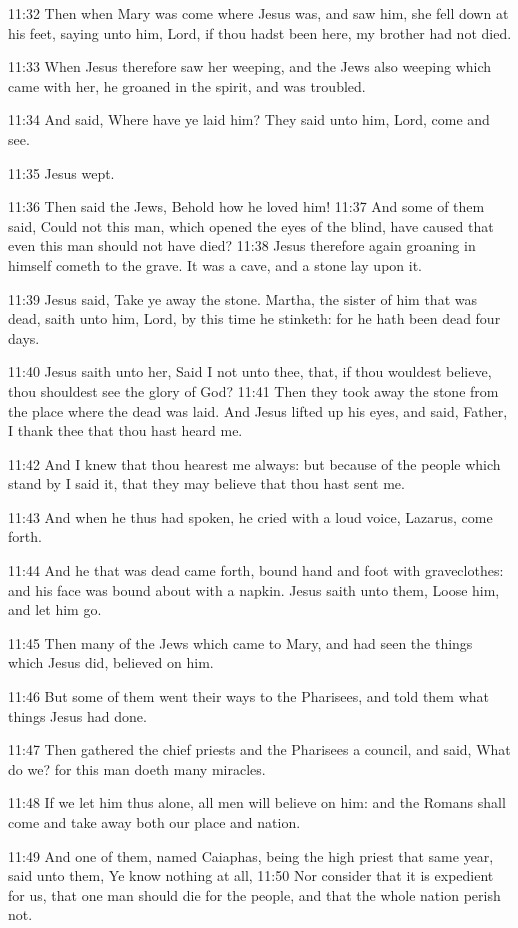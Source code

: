 11:32 Then when Mary was come where Jesus was, and saw him, she fell
down at his feet, saying unto him, Lord, if thou hadst been here, my
brother had not died.

11:33 When Jesus therefore saw her weeping, and the Jews also weeping
which came with her, he groaned in the spirit, and was troubled.

11:34 And said, Where have ye laid him? They said unto him, Lord, come
and see.

11:35 Jesus wept.

11:36 Then said the Jews, Behold how he loved him!  11:37 And some of
them said, Could not this man, which opened the eyes of the blind,
have caused that even this man should not have died?  11:38 Jesus
therefore again groaning in himself cometh to the grave. It was a
cave, and a stone lay upon it.

11:39 Jesus said, Take ye away the stone. Martha, the sister of him
that was dead, saith unto him, Lord, by this time he stinketh: for he
hath been dead four days.

11:40 Jesus saith unto her, Said I not unto thee, that, if thou
wouldest believe, thou shouldest see the glory of God?  11:41 Then
they took away the stone from the place where the dead was laid. And
Jesus lifted up his eyes, and said, Father, I thank thee that thou
hast heard me.

11:42 And I knew that thou hearest me always: but because of the
people which stand by I said it, that they may believe that thou hast
sent me.

11:43 And when he thus had spoken, he cried with a loud voice,
Lazarus, come forth.

11:44 And he that was dead came forth, bound hand and foot with
graveclothes: and his face was bound about with a napkin. Jesus saith
unto them, Loose him, and let him go.

11:45 Then many of the Jews which came to Mary, and had seen the
things which Jesus did, believed on him.

11:46 But some of them went their ways to the Pharisees, and told them
what things Jesus had done.

11:47 Then gathered the chief priests and the Pharisees a council, and
said, What do we? for this man doeth many miracles.

11:48 If we let him thus alone, all men will believe on him: and the
Romans shall come and take away both our place and nation.

11:49 And one of them, named Caiaphas, being the high priest that same
year, said unto them, Ye know nothing at all, 11:50 Nor consider that
it is expedient for us, that one man should die for the people, and
that the whole nation perish not.

